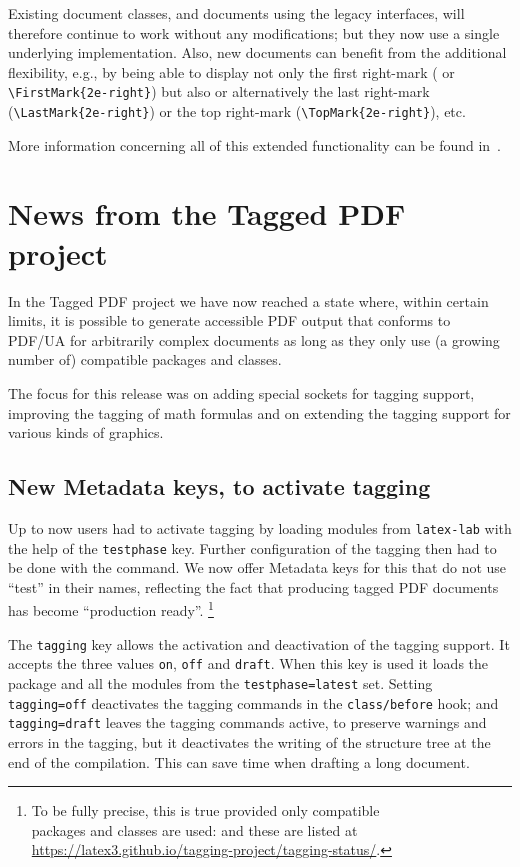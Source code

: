 \documentclass{ltnews}
\begin{document}
Existing document classes, and documents using the legacy interfaces,
will therefore continue to work without any modifications; but they
now use a single underlying implementation. Also, new documents can
benefit from the additional flexibility, e.g., by being able to
display not only the first right-mark ( or
\verb=\FirstMark{2e-right}=) but also or alternatively the last
right-mark (\verb=\LastMark{2e-right}=) or the top right-mark
(\verb=\TopMark{2e-right}=), etc.

More information concerning all of this extended functionality can be
found in~\cite{41:ltmarks}.


\section{News from the Tagged PDF project}

In the Tagged PDF project we have now reached a state where, within
certain limits, it is possible to generate accessible PDF output that
conforms to PDF/UA for arbitrarily complex documents as long as they
only use (a growing number of) compatible packages and classes.

The focus for this release was on adding special sockets for tagging
support, improving the tagging of math formulas and on extending the
tagging support for various kinds of graphics.

\subsection{New Metadata keys, to activate tagging}

Up to now users had to activate tagging by loading modules from
\texttt{latex-lab} with the help of the \texttt{testphase}
key. Further configuration of the tagging then had to be done with the
 command.  We now offer Metadata keys for this 
that do not use
\enquote{test} in their names, reflecting the fact that producing
tagged PDF documents has become \enquote{production ready}.%
\footnote{To be fully precise, this is true provided
only compatible\\
packages and classes are used: and these are listed at\\
\url{https://latex3.github.io/tagging-project/tagging-status/}.}

The \texttt{tagging} key allows the activation and deactivation of the tagging
support.  It accepts the three values \texttt{on}, \texttt{off} and
\texttt{draft}.  When this key is used it loads the
 package and all the modules from the
\texttt{testphase=latest} set.  Setting \texttt{tagging=off} deactivates the
tagging commands in the 
\texttt{class/before} hook; and \texttt{tagging=draft} leaves the 
tagging commands active, to 
preserve warnings and errors in the tagging, but it deactivates
the writing of the structure tree at the end of the compilation. This
can save time when drafting a long document.
\end{document}
